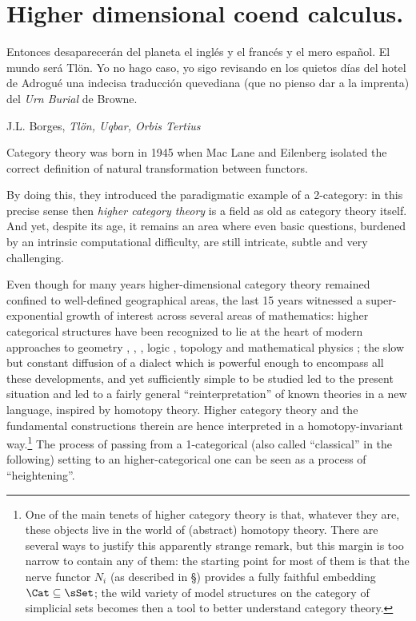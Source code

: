 \def\p{\text{p}}
\section{Higher dimensional coend calculus.}\label{sec:higher}
\epigraph{Entonces desaparecerán del planeta el inglés y el francés y el mero español. El mundo será Tlön. Yo no hago caso, yo sigo revisando en los quietos días del hotel de Adrogué una indecisa traducción quevediana (que no pienso dar a la imprenta) del {\em Urn Burial} de Browne.}{J.L. Borges, \emph{Tl\"on, Uqbar, Orbis Tertius}}
Category theory was born in 1945 when Mac Lane and Eilenberg \cite{gtone} isolated the correct definition of natural transformation between functors.

By doing this, they  introduced the paradigmatic example of a 2-category: in this precise sense then \emph{higher category theory} is a field as old as category theory itself. And yet, despite its age, it remains an area where even basic questions, burdened by an intrinsic computational difficulty, are still intricate, subtle and very challenging.

Even though for many years higher-dimensional category theory remained confined to well-defined geographical areas, the last 15 years witnessed a super-exponential growth of interest across several areas of mathematics: higher categorical structures have been recognized to lie at the heart of modern approaches to geometry \cite{toen2005homotopical}, \cite{HTT}, \cite{ben2010integral}, logic \cite{hottbook}, topology and mathematical physics \cite{Schreiber2013}; the slow but constant diffusion of a dialect which is powerful enough to encompass all these developments, and yet sufficiently simple to be studied led to the present situation and led to a fairly general ``reinterpretation'' of known theories in a new language, inspired by homotopy theory. Higher category theory and the fundamental constructions therein are hence interpreted in a homotopy-invariant way.\footnote{One of the main tenets of higher category theory is that, whatever they are, these objects live in the world of (abstract) homotopy theory. There are several ways to justify this apparently strange remark, but this margin is too narrow to contain any of them: the starting point for most of them is that the nerve functor $N_i$ (as described in \S{}) provides a fully faithful embedding $\Cat\subseteq \sSet$; the wild variety of model structures on the category of simplicial sets becomes then a tool to better understand category theory.} The process of passing from a 1-categorical (also called ``classical'' in the following) setting to an higher-categorical one can be seen as a process of ``heightening''.

